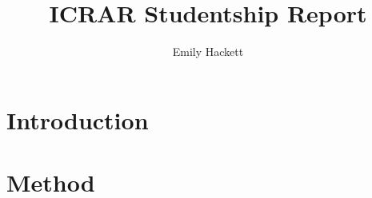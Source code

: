 \documentclass[a4paper,fleqn,usenatbib,useAMS]{mnras}
\title[ICRAR Report]{ICRAR Studentship Report}
\author[E. Hackett]{Emily Hackett}
\begin{document}
\label{firstpage}
\maketitle

\begin{abstract}

\end{abstract}

\section{Introduction}


\section{Method}




\end{document}
